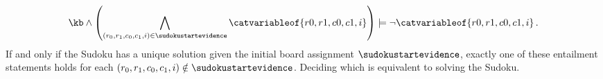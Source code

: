 \begin{example}
\begin{align*}
        \kb \land \left(\bigwedge_{(r_0,r_1,c_0,c_1,i)\in \sudokustartevidence} \catvariableof{r0,r1,c0,c1,i} \right) \models \lnot\catvariableof{r0,r1,c0,c1,i} \, .
    \end{align*}
    If and only if the Sudoku has a unique solution given the initial board assignment $\sudokustartevidence$, exactly one of these entailment statements holds for each $(r_0,r_1,c_0,c_1,i)\notin \sudokustartevidence$.
    Deciding which is equivalent to solving the Sudoku.


\end{example}
